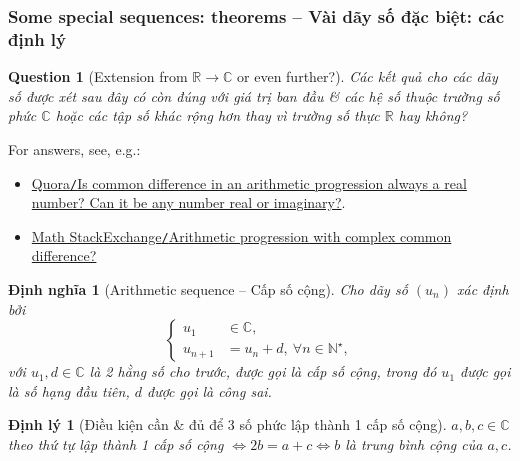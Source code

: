 \documentclass{article}
\newtheorem{dinhly}{Định lý}
\newtheorem{dinhnghia}{Định nghĩa}
\newtheorem{question}{Question}
\begin{document}

\subsubsection{Some special sequences: theorems -- Vài dãy số đặc biệt: các định lý}

\begin{question}[Extension from $\mathbb{R}\to\mathbb{C}$ or even further?]
	Các kết quả cho các dãy số được xét sau đây có còn đúng với giá trị ban đầu \& các hệ số thuộc trường số phức $\mathbb{C}$ hoặc các tập số khác rộng hơn thay vì trường số thực $\mathbb{R}$ hay không?
\end{question}
For answers, see, e.g.:
\begin{itemize}
	\item \href{https://www.quora.com/Is-common-difference-in-an-arithmetic-progression-always-a-real-number-Can-it-be-any-number-real-or-imaginary}{Quora{\tt/}Is common difference in an arithmetic progression always a real number? Can it be any number real or imaginary?}.
	\item \href{https://math.stackexchange.com/questions/1299820/arithmetic-progression-with-complex-common-difference}{Math StackExchange{\tt/}Arithmetic progression with complex common difference?}
\end{itemize}

\begin{dinhnghia}[Arithmetic sequence -- Cấp số cộng]
	Cho dãy số $(u_n)$ xác định bởi
	\begin{equation}
		\label{arithmetic sequence}
		\tag{csc}
		\left\{\begin{split}
			u_1&\in\mathbb{C},\\
			u_{n+1} &= u_n + d,\ \forall n\in\mathbb{N}^\star,
		\end{split}\right.
	\end{equation}
	với $u_1,d\in\mathbb{C}$ là 2 hằng số cho trước, được gọi là {\rm cấp số cộng}, trong đó $u_1$ được gọi là {\rm số hạng đầu tiên}, $d$ được gọi là {\rm công sai}.
\end{dinhnghia}

\begin{dinhly}[Điều kiện cần \& đủ để 3 số phức lập thành 1 cấp số cộng]
	$a,b,c\in\mathbb{C}$ theo thứ tự lập thành 1 cấp số cộng $\Leftrightarrow2b = a + c\Leftrightarrow b$ là trung bình cộng của $a,c$.
\end{dinhly}
\end{document}
